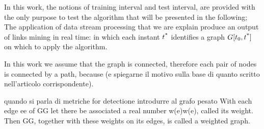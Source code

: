 In this work, the notions of training interval and test interval, are provided with the only purpose to test the algorithm that will be presented in the following; The application of data stream processing that we are explain produce an output of links mining in real time: in which each instant $t\textsuperscript{*}$ identifies a graph $G[t_{0},t\textsuperscript{*}]$ on which to apply the algorithm.

 


In this work we assume that the graph is connected, therefore each pair of nodes is connected by a path, because  (e spiegarne il motivo sulla base di quanto scritto nell'articolo corrispondente).

quando si parla di metriche for detectione introdurre al grafo pesato With each edge ee of GG let there be associated a real number w(e)w(e), called its weight. Then GG, together with these weights on its edges, is called a weighted graph.